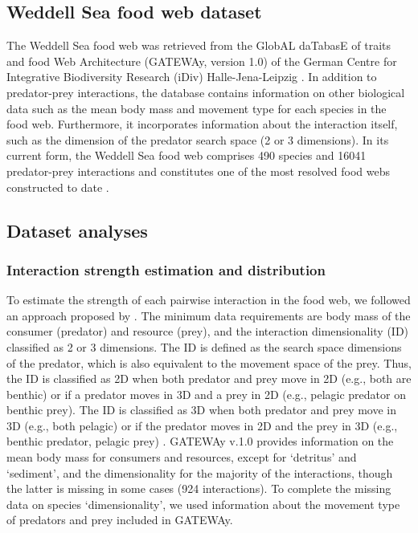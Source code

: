 \documentclass[gc, manuscript]{copernicus}
\begin{document}
\subsection{Weddell Sea food web dataset}

The Weddell Sea food web was retrieved from the GlobAL daTabasE of
traits and food Web Architecture (GATEWAy, version 1.0) of the German
Centre for Integrative Biodiversity Research (iDiv) Halle-Jena-Leipzig
\citep{Brose2018}. In addition to predator-prey interactions, the
database contains information on other biological data such as the mean
body mass and movement type for each species in the food web.
Furthermore, it incorporates information about the interaction itself,
such as the dimension of the predator search space (2 or 3 dimensions).
In its current form, the Weddell Sea food web comprises 490 species and
16041 predator-prey interactions and constitutes one of the most
resolved food webs constructed to date \citep{Jacob2011}.

\subsection{Dataset analyses}

\subsubsection{Interaction strength estimation and distribution}

To estimate the strength of each pairwise interaction in the food web,
we followed an approach proposed by \citet{Pawar2012}. The minimum data
requirements are body mass of the consumer (predator) and resource
(prey), and the interaction dimensionality (ID) classified as 2 or 3
dimensions. The ID is defined as the search space dimensions of the
predator, which is also equivalent to the movement space of the prey.
Thus, the ID is classified as 2D when both predator and prey move in 2D
(e.g., both are benthic) or if a predator moves in 3D and a prey in 2D
(e.g., pelagic predator on benthic prey). The ID is classified as 3D
when both predator and prey move in 3D (e.g., both pelagic) or if the
predator moves in 2D and the prey in 3D (e.g., benthic predator, pelagic
prey) \citep{Pawar2012}. GATEWAy v.1.0 provides information on the mean
body mass for consumers and resources, except for `detritus' and
`sediment', and the dimensionality for the majority of the interactions,
though the latter is missing in some cases (924 interactions). To
complete the missing data on species `dimensionality', we used
information about the movement type of predators and prey included in
GATEWAy.
\end{document}
